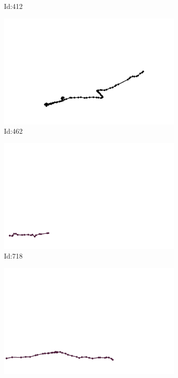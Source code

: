 \documentclass[12pt,twoside]{report}
\begin{document}
\begin{figure}
\begin{subfigure}[b]{0.20\textwidth}
\caption{Id:412}
\end{subfigure}
\begin{subfigure}[b]{0.20\textwidth}
\centering
\includegraphics[width=\textwidth]{../trajectories/462.png}
\caption{Id:462}
\end{subfigure}
\begin{subfigure}[b]{0.20\textwidth}
\centering
\includegraphics[width=\textwidth]{../trajectories/718.png}
\caption{Id:718}
\end{subfigure}
\begin{subfigure}[b]{0.20\textwidth}
\centering
\includegraphics[width=\textwidth]{../trajectories/725.png}

\end{subfigure}
\end{figure}
\end{document}
